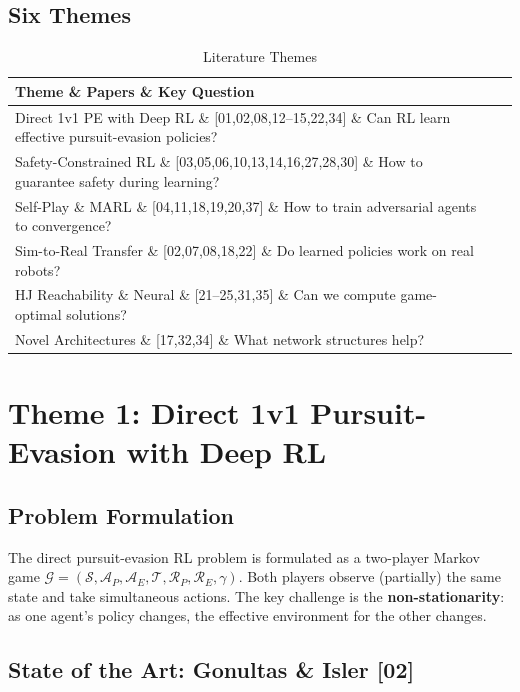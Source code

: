 \documentclass[11pt,a4paper]{report}
\begin{document}
\subsection{Six Themes}

\begin{table}[h]
\centering
\caption{Literature Themes}
\label{tab:themes}
\begin{tabular}{@{}p{4cm}p{2.5cm}p{6cm}@{}}
\toprule
\textbf{Theme} \& \textbf{Papers} \& \textbf{Key Question} \\
\midrule
Direct 1v1 PE with Deep RL \& [01,02,08,12--15,22,34] \& Can RL learn effective pursuit-evasion policies? \\
Safety-Constrained RL \& [03,05,06,10,13,14,16,27,28,30] \& How to guarantee safety during learning? \\
Self-Play \& MARL \& [04,11,18,19,20,37] \& How to train adversarial agents to convergence? \\
Sim-to-Real Transfer \& [02,07,08,18,22] \& Do learned policies work on real robots? \\
HJ Reachability \& Neural \& [21--25,31,35] \& Can we compute game-optimal solutions? \\
Novel Architectures \& [17,32,34] \& What network structures help? \\
\bottomrule
\end{tabular}
\end{table}

\section{Theme 1: Direct 1v1 Pursuit-Evasion with Deep RL}

\subsection{Problem Formulation}

The direct pursuit-evasion RL problem is formulated as a two-player Markov game $\mathcal{G} = (\mathcal{S}, \mathcal{A}_P, \mathcal{A}_E, \mathcal{T}, \mathcal{R}_P, \mathcal{R}_E, \gamma)$. Both players observe (partially) the same state and take simultaneous actions. The key challenge is the \textbf{non-stationarity}: as one agent's policy changes, the effective environment for the other changes.

\subsection{State of the Art: Gonultas \& Isler [02]}
\end{document}
